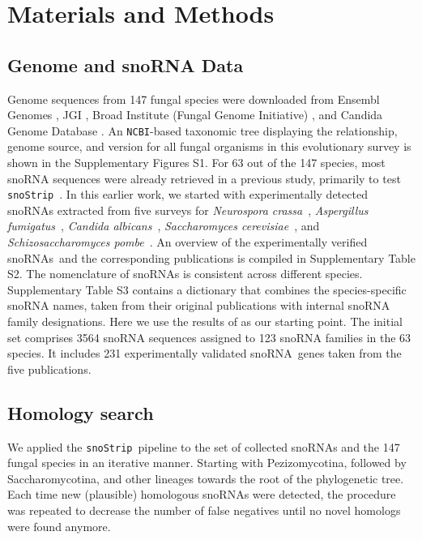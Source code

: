 \documentclass[preprint,3p,times]{elsarticle}
\newcommand{\snos}{snoRNAs}
\newcommand{\sno}{snoRNA}
\newcommand{\snostrip}{\texttt{snoStrip}}
\newcommand{\ncbi}{\texttt{NCBI}}
\newcommand{\Afu}{\emph{Aspergillus fumigatus}}
\newcommand{\Calb}{\emph{Candida albicans}}
\newcommand{\Spo}{\emph{Schizosaccharomyces pombe}}
\newcommand{\Ncr}{\emph{Neurospora crassa}}
\newcommand{\Sce}{\emph{Saccharomyces cerevisiae}}
\begin{document}

\section{Materials and Methods}

\subsection{Genome and snoRNA Data} 

Genome sequences from 147 fungal species were downloaded from Ensembl
Genomes \cite{Kersey:2016}, JGI \cite{Nordberg:2014}, Broad Institute
(Fungal Genome Initiative) , and Candida Genome Database
\cite{Skrzypek:2017}.  An \ncbi-based taxonomic tree displaying the
relationship, genome source, and version for all fungal organisms in
this evolutionary survey is shown in the Supplementary Figures S1.
For 63 out of the 147 species, most snoRNA sequences were already
retrieved in a previous study, primarily to test \snostrip\
\cite{Bartschat:2014}.  In this earlier work, we started with
experimentally detected snoRNAs extracted from five surveys for \Ncr\
\cite{Liu:2009}, \Afu\ \cite{Joechl:2008}, \Calb\
\cite{Mitrovich:2010}, \Sce\ \cite{Piekna-Przybylska:2007}, and \Spo\
\cite{Li:2005}. An overview of the experimentally verified \snos\ and
the corresponding publications is compiled in Supplementary Table
S2. The nomenclature of snoRNAs is consistent across different
species.  Supplementary Table S3 contains a dictionary that combines
the species-specific snoRNA names, taken from their original
publications with internal snoRNA family designations.  Here we use
the results of \cite{Bartschat:2014} as our starting point.  The
initial set comprises 3564 snoRNA sequences assigned to 123 snoRNA
families in the 63 species. It includes 231 experimentally validated
\sno\ genes taken from the five publications.

\subsection{Homology search}

We applied the \snostrip\ pipeline \cite{Bartschat:2014} to the set
of collected snoRNAs and the 147 fungal species in an iterative
manner. Starting with Pezizomycotina, followed by Saccharomycotina,
and other lineages towards the root of the phylogenetic tree. Each
time new (plausible) homologous snoRNAs were detected, the procedure
was repeated to decrease the number of false negatives until no novel
homologs were found anymore.
\end{document}
